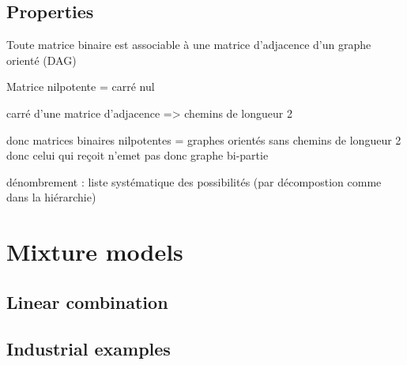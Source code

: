 \documentclass[12pt,a4paper]{report}
\begin{document}
		\section{Properties}
		Toute matrice binaire est associable à une matrice d'adjacence d'un graphe orienté (DAG)
		
		Matrice nilpotente = carré nul
		
		carré d'une matrice d'adjacence => chemins de longueur 2
		
		donc matrices binaires nilpotentes = graphes orientés sans chemins de longueur 2 donc celui qui reçoit n'emet pas donc graphe bi-partie
		
		dénombrement : liste systématique des possibilités (par décompostion comme dans la hiérarchie)		
		
	\chapter{Mixture models}
		\section{Linear combination}
			
		\section{Industrial examples}	
\end{document}
